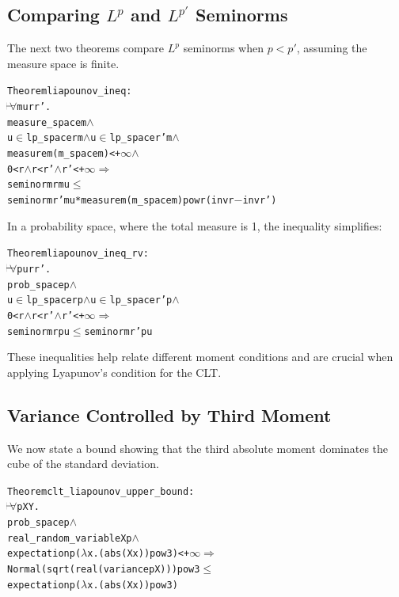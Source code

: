 \subsection{Comparing $L^p$ and $L^{p'}$ Seminorms}

The next two theorems compare $L^p$ seminorms when $p < p'$, assuming the measure space is finite.

\begin{hol}
\begin{alltt}
Theorem liapounov\_ineq :
\(\!\!\!{\turn}\!\!\!\!\) \(\forall\)m u r r'.
measure\_space m \(\land\)
u \(\in\) lp\_space r m \(\land\) u \(\in\) lp\_space r' m \(\land\)
measure m (m\_space m) < +\(\infty\) \(\land\)
0 < r \(\land\) r < r' \(\land\) r' < +\(\infty\) \(\Rightarrow\)
seminorm r m u \(\le\)
seminorm r' m u * measure m (m\_space m) powr (inv r \({-}\) inv r')
\end{alltt}
\end{hol}

In a probability space, where the total measure is 1, the inequality simplifies:

\begin{hol}
\begin{alltt}
Theorem liapounov\_ineq\_rv :
\(\!\!\!{\turn}\!\!\!\!\) \(\forall\)p u r r'.
prob\_space p \(\land\)
u \(\in\) lp\_space r p \(\land\) u \(\in\) lp\_space r' p \(\land\)
0 < r \(\land\) r < r' \(\land\) r' < +\(\infty\) \(\Rightarrow\)
seminorm r p u \(\le\) seminorm r' p u
\end{alltt}
\end{hol}

These inequalities help relate different moment conditions and are crucial when applying Lyapunov’s condition for the CLT.

\subsection{Variance Controlled by Third Moment}

We now state a bound showing that the third absolute moment dominates the cube of the standard deviation.

\begin{hol}
\begin{alltt}
Theorem clt\_liapounov\_upper\_bound :
\(\!\!\!{\turn}\!\!\!\!\) \(\forall\)p X Y.
prob\_space p \(\land\)
real\_random\_variable X p \(\land\)
expectation p (\(\lambda\)x. (abs (X x)) pow 3) < +\(\infty\) \(\Rightarrow\)
Normal (sqrt (real (variance p X))) pow 3 \(\le\)
expectation p (\(\lambda\)x. (abs (X x)) pow 3)
\end{alltt}
\end{hol}

